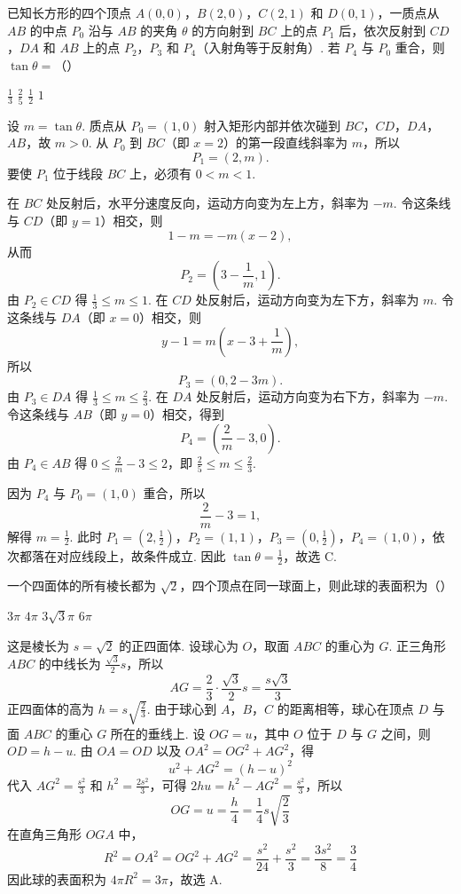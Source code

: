 \begin{problem}
已知长方形的四个顶点 \(A(0,0)\)，\(B(2,0)\)，\(C(2,1)\) 和 \(D(0,1)\)，一质点从 \(AB\) 的中点 \(P_0\) 沿与 \(AB\) 的夹角 \(\theta\) 的方向射到 \(BC\) 上的点 \(P_1\) 后，依次反射到 \(CD\)，\(DA\) 和 \(AB\) 上的点 \(P_2\)，\(P_3\) 和 \(P_4\)（入射角等于反射角）. 若 \(P_4\) 与 \(P_0\) 重合，则 \(\tan\theta=\)（\quad）

\choices
    {\(\frac13\)}
    {\(\frac25\)}
    {\(\frac12\)}
    {\(1\)}

\begin{solution}
设 \(m=\tan\theta\). 质点从 \(P_0=(1,0)\) 射入矩形内部并依次碰到 \(BC\)，\(CD\)，\(DA\)，\(AB\)，故 \(m>0\). 从 \(P_0\) 到 \(BC\)（即 \(x=2\)）的第一段直线斜率为 \(m\)，所以
\[
P_1=(2,m).
\]
要使 \(P_1\) 位于线段 \(BC\) 上，必须有 \(0<m<1\).

在 \(BC\) 处反射后，水平分速度反向，运动方向变为左上方，斜率为 \(-m\). 令这条线与 \(CD\)（即 \(y=1\)）相交，则
\[
1-m=-m(x-2),
\]
从而
\[
P_2=\left(3-\frac1m,1\right).
\]
由 \(P_2\in CD\) 得 \(\frac13\leqslant m\leqslant1\). 在 \(CD\) 处反射后，运动方向变为左下方，斜率为 \(m\). 令这条线与 \(DA\)（即 \(x=0\)）相交，则
\[
y-1=m\left(x-3+\frac1m\right),
\]
所以
\[
P_3=(0,2-3m).
\]
由 \(P_3\in DA\) 得 \(\frac13\leqslant m\leqslant\frac23\). 在 \(DA\) 处反射后，运动方向变为右下方，斜率为 \(-m\). 令这条线与 \(AB\)（即 \(y=0\)）相交，得到
\[
P_4=\left(\frac{2}{m}-3,0\right).
\]
由 \(P_4\in AB\) 得 \(0\leqslant\frac2m-3\leqslant2\)，即 \(\frac25\leqslant m\leqslant\frac23\).

因为 \(P_4\) 与 \(P_0=(1,0)\) 重合，所以
\[
\frac{2}{m}-3=1,
\]
解得 \(m=\frac12\). 此时 \(P_1=\left(2,\frac12\right)\)，\(P_2=(1,1)\)，\(P_3=\left(0,\frac12\right)\)，\(P_4=(1,0)\)，依次都落在对应线段上，故条件成立. 因此 \(\tan\theta=\frac12\)，故选 C.
\end{solution}
\end{problem}

\begin{problem}
一个四面体的所有棱长都为 \(\sqrt2\)，四个顶点在同一球面上，则此球的表面积为（\quad）

\choices
    {\(3\pi\)}
    {\(4\pi\)}
    {\(3\sqrt3\pi\)}
    {\(6\pi\)}

\begin{solution}
这是棱长为 \(s=\sqrt2\) 的正四面体. 设球心为 \(O\)，取面 \(ABC\) 的重心为 \(G\). 正三角形 \(ABC\) 的中线长为 \(\frac{\sqrt3}{2}s\)，所以
\[
AG=\frac23\cdot\frac{\sqrt3}{2}s=\frac{s\sqrt3}{3}
\]
正四面体的高为 \(h=s\sqrt{\frac23}\). 由于球心到 \(A\)，\(B\)，\(C\) 的距离相等，球心在顶点 \(D\) 与面 \(ABC\) 的重心 \(G\) 所在的垂线上. 设 \(OG=u\)，其中 \(O\) 位于 \(D\) 与 \(G\) 之间，则 \(OD=h-u\). 由 \(OA=OD\) 以及 \(OA^2=OG^2+AG^2\)，得
\[
u^2+AG^2=(h-u)^2
\]
代入 \(AG^2=\frac{s^2}{3}\) 和 \(h^2=\frac{2s^2}{3}\)，可得 \(2hu=h^2-AG^2=\frac{s^2}{3}\)，所以
\[
OG=u=\frac{h}{4}=\frac14s\sqrt{\frac23}
\]
在直角三角形 \(OGA\) 中，
\[
R^2=OA^2=OG^2+AG^2
=\frac{s^2}{24}+\frac{s^2}{3}
=\frac{3s^2}{8}=\frac34
\]
因此球的表面积为 \(4\pi R^2=3\pi\)，故选 A.
\end{solution}
\end{problem}

